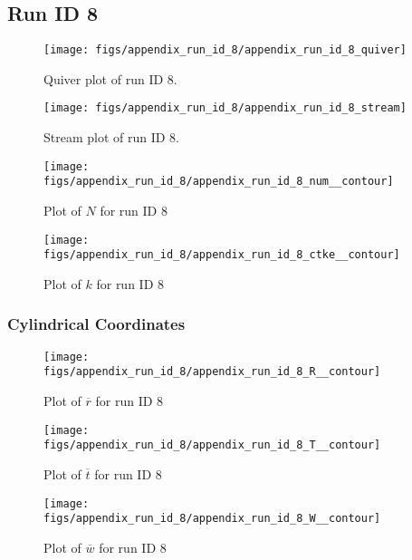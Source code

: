 \subsection{Run ID 8}
\begin{figure}[H]
\centering
\texttt{[image: figs/appendix\_run\_id\_8/appendix\_run\_id\_8\_quiver]}
\caption{Quiver plot of run ID 8.}
\label{fig:appendix_run_id_8_quiver}
\end{figure}


\begin{figure}[H]
\centering
\texttt{[image: figs/appendix\_run\_id\_8/appendix\_run\_id\_8\_stream]}
\caption{Stream plot of run ID 8.}
\label{fig:appendix_run_id_8_stream}
\end{figure}


\begin{figure}[H]
\centering
\texttt{[image: figs/appendix\_run\_id\_8/appendix\_run\_id\_8\_num\_\_contour]}
\caption{Plot of $N$ for run ID 8}
\label{fig:appendix_run_id_8_num__contour}
\end{figure}


\begin{figure}[H]
\centering
\texttt{[image: figs/appendix\_run\_id\_8/appendix\_run\_id\_8\_ctke\_\_contour]}
\caption{Plot of $k$ for run ID 8}
\label{fig:appendix_run_id_8_ctke__contour}
\end{figure}


\subsubsection{Cylindrical Coordinates}
\begin{figure}[H]
\centering
\texttt{[image: figs/appendix\_run\_id\_8/appendix\_run\_id\_8\_R\_\_contour]}
\caption{Plot of $\overline{r}$ for run ID 8}
\label{fig:appendix_run_id_8_R__contour}
\end{figure}


\begin{figure}[H]
\centering
\texttt{[image: figs/appendix\_run\_id\_8/appendix\_run\_id\_8\_T\_\_contour]}
\caption{Plot of $\overline{t}$ for run ID 8}
\label{fig:appendix_run_id_8_T__contour}
\end{figure}


\begin{figure}[H]
\centering
\texttt{[image: figs/appendix\_run\_id\_8/appendix\_run\_id\_8\_W\_\_contour]}
\caption{Plot of $\overline{w}$ for run ID 8}
\label{fig:appendix_run_id_8_W__contour}
\end{figure}


